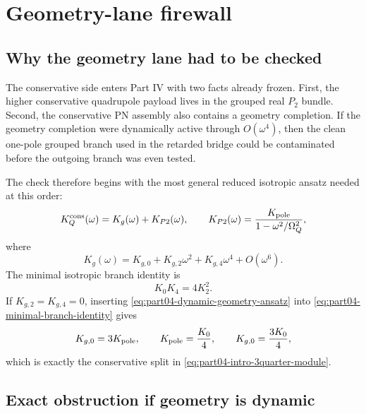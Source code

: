 \section{Geometry-lane firewall}
\label{sec:part04_geometry_retarded_mouth:geometry-lane-firewall}

\subsection{Why the geometry lane had to be checked}
\label{subsec:part04-geometry-why}

The conservative side enters Part IV with two facts already frozen.  First, the higher conservative quadrupole payload lives in the grouped real \(P_2\) bundle.  Second, the conservative PN assembly also contains a geometry completion.  If the geometry completion were dynamically active through \(O(\omega^4)\), then the clean one-pole grouped branch used in the retarded bridge could be contaminated before the outgoing branch was even tested.

The check therefore begins with the most general reduced isotropic ansatz needed at this order:
\begin{equation}
\label{eq:part04-dynamic-geometry-ansatz}
K_Q^{\rm cons}(\omega)
=
K_g(\omega)+K_{P2}(\omega),
\qquad
K_{P2}(\omega)=\frac{K_{\rm pole}}{1-\omega^2/\Omega_Q^2},
\end{equation}
where
\begin{equation}
\label{eq:part04-geometry-even-expansion}
K_g(\omega)=K_{g,0}+K_{g,2}\omega^2+K_{g,4}\omega^4+O(\omega^6).
\end{equation}
The minimal isotropic branch identity is
\begin{equation}
\label{eq:part04-minimal-branch-identity}
K_0K_4=4K_2^2.
\end{equation}
If \(K_{g,2}=K_{g,4}=0\), inserting \eqref{eq:part04-dynamic-geometry-ansatz} into \eqref{eq:part04-minimal-branch-identity} gives
\begin{equation}
\label{eq:part04-geometry-static-split}
K_{g,0}=3K_{\rm pole},
\qquad
K_{\rm pole}=\frac{K_0}{4},
\qquad
K_{g,0}=\frac{3K_0}{4},
\end{equation}
which is exactly the conservative split in \eqref{eq:part04-intro-3quarter-module}.

\subsection{Exact obstruction if geometry is dynamic}
\label{subsec:part04-dynamic-geometry-obstruction}

